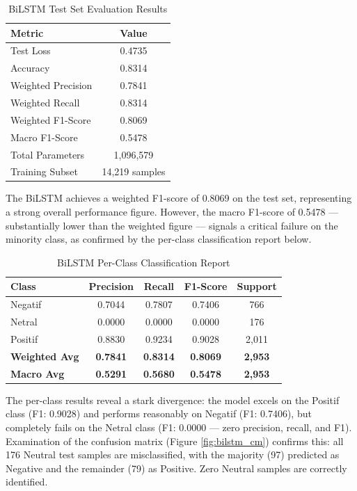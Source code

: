 \documentclass{article}
\begin{document}
\begin{table}[H]
\centering
\caption{BiLSTM Test Set Evaluation Results}
\label{tab:bilstm_results}
\begin{tabular}{lc}
\toprule
\textbf{Metric} & \textbf{Value} \\ \midrule
Test Loss & 0.4735 \\
Accuracy & 0.8314 \\
Weighted Precision & 0.7841 \\
Weighted Recall & 0.8314 \\
Weighted F1-Score & 0.8069 \\
Macro F1-Score & 0.5478 \\
Total Parameters & 1,096,579 \\
Training Subset & 14,219 samples \\ \bottomrule
\end{tabular}
\end{table}

The BiLSTM achieves a weighted F1-score of 0.8069 on the test set, representing a strong overall performance figure. However, the macro F1-score of 0.5478 --- substantially lower than the weighted figure --- signals a critical failure on the minority class, as confirmed by the per-class classification report below.

\begin{table}[H]
\centering
\caption{BiLSTM Per-Class Classification Report}
\label{tab:bilstm_report}
\begin{tabular}{lcccc}
\toprule
\textbf{Class} & \textbf{Precision} & \textbf{Recall} & \textbf{F1-Score} & \textbf{Support} \\ \midrule
Negatif & 0.7044 & 0.7807 & 0.7406 & 766 \\
Netral & 0.0000 & 0.0000 & 0.0000 & 176 \\
Positif & 0.8830 & 0.9234 & 0.9028 & 2,011 \\ \midrule
\textbf{Weighted Avg} & \textbf{0.7841} & \textbf{0.8314} & \textbf{0.8069} & \textbf{2,953} \\
\textbf{Macro Avg} & \textbf{0.5291} & \textbf{0.5680} & \textbf{0.5478} & \textbf{2,953} \\ \bottomrule
\end{tabular}
\end{table}

The per-class results reveal a stark divergence: the model excels on the Positif class (F1: 0.9028) and performs reasonably on Negatif (F1: 0.7406), but completely fails on the Netral class (F1: 0.0000 --- zero precision, recall, and F1). Examination of the confusion matrix (Figure \ref{fig:bilstm_cm}) confirms this: all 176 Neutral test samples are misclassified, with the majority (97) predicted as Negative and the remainder (79) as Positive. Zero Neutral samples are correctly identified.
\end{document}
